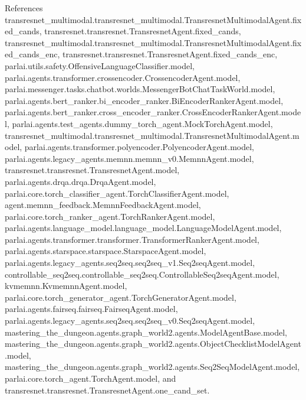 References transresnet\+\_\+multimodal.\+transresnet\+\_\+multimodal.\+Transresnet\+Multimodal\+Agent.\+fixed\+\_\+cands, transresnet.\+transresnet.\+Transresnet\+Agent.\+fixed\+\_\+cands, transresnet\+\_\+multimodal.\+transresnet\+\_\+multimodal.\+Transresnet\+Multimodal\+Agent.\+fixed\+\_\+cands\+\_\+enc, transresnet.\+transresnet.\+Transresnet\+Agent.\+fixed\+\_\+cands\+\_\+enc, parlai.\+utils.\+safety.\+Offensive\+Language\+Classifier.\+model, parlai.\+agents.\+transformer.\+crossencoder.\+Crossencoder\+Agent.\+model, parlai.\+messenger.\+tasks.\+chatbot.\+worlds.\+Messenger\+Bot\+Chat\+Task\+World.\+model, parlai.\+agents.\+bert\+\_\+ranker.\+bi\+\_\+encoder\+\_\+ranker.\+Bi\+Encoder\+Ranker\+Agent.\+model, parlai.\+agents.\+bert\+\_\+ranker.\+cross\+\_\+encoder\+\_\+ranker.\+Cross\+Encoder\+Ranker\+Agent.\+model, parlai.\+agents.\+test\+\_\+agents.\+dummy\+\_\+torch\+\_\+agent.\+Mock\+Torch\+Agent.\+model, transresnet\+\_\+multimodal.\+transresnet\+\_\+multimodal.\+Transresnet\+Multimodal\+Agent.\+model, parlai.\+agents.\+transformer.\+polyencoder.\+Polyencoder\+Agent.\+model, parlai.\+agents.\+legacy\+\_\+agents.\+memnn.\+memnn\+\_\+v0.\+Memnn\+Agent.\+model, transresnet.\+transresnet.\+Transresnet\+Agent.\+model, parlai.\+agents.\+drqa.\+drqa.\+Drqa\+Agent.\+model, parlai.\+core.\+torch\+\_\+classifier\+\_\+agent.\+Torch\+Classifier\+Agent.\+model, agent.\+memnn\+\_\+feedback.\+Memnn\+Feedback\+Agent.\+model, parlai.\+core.\+torch\+\_\+ranker\+\_\+agent.\+Torch\+Ranker\+Agent.\+model, parlai.\+agents.\+language\+\_\+model.\+language\+\_\+model.\+Language\+Model\+Agent.\+model, parlai.\+agents.\+transformer.\+transformer.\+Transformer\+Ranker\+Agent.\+model, parlai.\+agents.\+starspace.\+starspace.\+Starspace\+Agent.\+model, parlai.\+agents.\+legacy\+\_\+agents.\+seq2seq.\+seq2seq\+\_\+v1.\+Seq2seq\+Agent.\+model, controllable\+\_\+seq2seq.\+controllable\+\_\+seq2seq.\+Controllable\+Seq2seq\+Agent.\+model, kvmemnn.\+Kvmemnn\+Agent.\+model, parlai.\+core.\+torch\+\_\+generator\+\_\+agent.\+Torch\+Generator\+Agent.\+model, parlai.\+agents.\+fairseq.\+fairseq.\+Fairseq\+Agent.\+model, parlai.\+agents.\+legacy\+\_\+agents.\+seq2seq.\+seq2seq\+\_\+v0.\+Seq2seq\+Agent.\+model, mastering\+\_\+the\+\_\+dungeon.\+agents.\+graph\+\_\+world2.\+agents.\+Model\+Agent\+Base.\+model, mastering\+\_\+the\+\_\+dungeon.\+agents.\+graph\+\_\+world2.\+agents.\+Object\+Checklist\+Model\+Agent.\+model, mastering\+\_\+the\+\_\+dungeon.\+agents.\+graph\+\_\+world2.\+agents.\+Seq2\+Seq\+Model\+Agent.\+model, parlai.\+core.\+torch\+\_\+agent.\+Torch\+Agent.\+model, and transresnet.\+transresnet.\+Transresnet\+Agent.\+one\+\_\+cand\+\_\+set.



